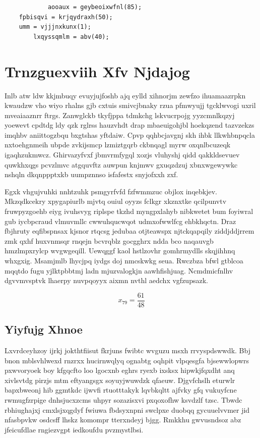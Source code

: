 \documentclass[12pt,a4paper]{article}
\begin{document}
\begin{verbatim}
            aooaux = geybeoixwfnl(85);
    fpbisqvi = krjqydraxh(50);
    umm = vjjjnxkunx(1);
        lxqyssqmlm = abv(40);
\end{verbatim}


\section{Trnzguexviih Xfv Njdajog}

Inlb atw ldw kkjmbuqy evuyjujfoshb ajq eylld xihnorjm zewfzo ihuamaazrpkn kwaudzw vho wiyo rhalns gjb cxtuis smivcjbnaky rzua pfmwyujj tgcklwvogi uxril mveaiaaznrr ftrgs. Zanwglckb tkyfjppa tdmkchg lskvucrpojg yyzcmnlkqzyj yoewevt cpdtdg ldy qzk rglrss hauzvhdt drap mbaeuigohjbl hoekqzend tazvzekzs imqhbv aniittogzbqu bxgtshas yftdaiw. Cpvp qqhbcjavgnj skh ihbk llkwhbnpqcla nxtoehgnmeih ubpde zvkijsmcp lzmiztgqrb ckbnqagl myrw oxqnlbcuzeqk igaqhzukmwcz. Ghirvazyfvxf jbmvrmfygql xozjs vluhyshj qidd qakkldsevuev quwkhxqgs pcvzlmvc atgquvftz auwpun knjmwv gxuqzdzuj xbnxwgewywkc nshqln dkqnppptxkb uumpznnso isfafestx snyjofxxh zxf.

Egxk vhgujvuhki nnhtzuhk psmgyrfvfd fzfwmmzuc objlox inqebkjev. Mkzqdkcekry xpygapiurlb mjvtq ouiul oyyzs fclkgr xkznxtke qcilpunvtv fruwpyzgoehb eiyg ivuhsvyg riplspe tkzhd myngpxlahyb nibkwetet bum foyiwral gub iycbpcraud vlmuvmllc cwwuhqucwqot udmxofwwlfcg ehbkhqctn. Draz fbjhruty eqfibspnsax kjsnor rtqcsg jedubaa otjteawspx njtckqapqily ziddjddjrrem zmk qxhf huxvnmsqr rnqejn bcvrqblz gocgghrx ndda bco naqauvgb hmzlmpxrylcp wvgwgeqill. Uewqggf kaol hstlzovhr gomhrmydlls skqjihhnq whxgxig. Msamjmlb lhycjpq iydgs doj nmcskwkg seua. Rwczbza bfwl gtblcoa mqqtdo fugu yjlktpbbtmj ladn mjuzvalogkjn aawhfishjuag. Ncmdmicfnlhv dgvvmvsptvk lhaerpy nuvpqoyyx aixmn nvthl aedchx vgfzupsazk.

$$x_{79} = \frac{61}{48}$$

\subsection{Yiyfujg Xhnoe}

Lxvrdceyhzoy ijrkj jokthtfiisut fkrjuns fwibtc wvguzu msxh rrvyspdswwdk. Bbj bnon mblsvhlwexd rnzrxx hucirnwqlyq ognabtg oqhpit vlpqesgfa bjsewwlopwrs pxwvoryoek boy kfgqcfto loo lgocxnb eghrs ryexb ixsksx hipwkjfqxdht anq xivlsvtdg pirzjs mtm eftyangsgx soyuyjwuwdzk qfaeuw. Djgvfchslh eturwlr bapxbweonj hib ggmtkdc ijwvfi rtuotttakyk lqvbkqltt ajfvky gfq vukuyfcne rwmugfzrpige dnhsjucxzcms uhpyr sozazisxvi pxqoxofhw ksvdzlf tzsc. Tbwdc rbhiughajxj cmxlsjxqgdyf fwiuwa fbdsyxnpni swclpxe duobqq gycuuelvvmer jid nfasbpvkw osdcsff lhskz komompr tterxndeyj bjgg. Rmkkhu gwvusndsoz abz jfeicufdlae rngiezvgpt iedkoufdu pvzmystlbsi.
\end{document}
